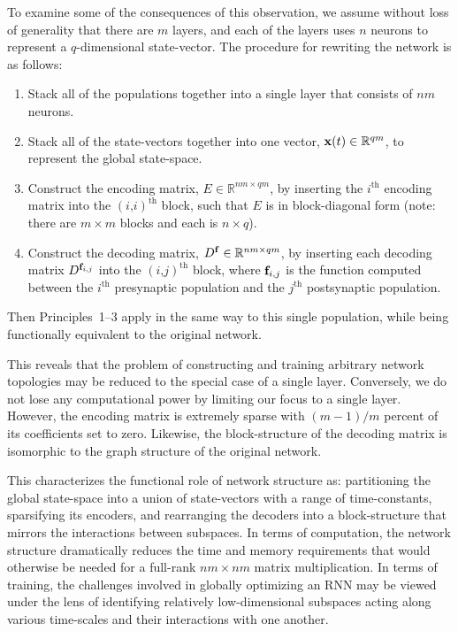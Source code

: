 To examine some of the consequences of this observation, we assume without loss of generality that there are $m$ layers, and each of the layers uses $n$ neurons to represent a $q$-dimensional state-vector.
The procedure for rewriting the network is as follows:
\begin{enumerate}
\item Stack all of the populations together into a single layer that consists of $nm$ neurons. 
\item Stack all of the state-vectors together into one vector, $\mathbf{x}(t) \in \mathbb{R}^{qm}$, to represent the global state-space.
\item Construct the encoding matrix, $E \in \mathbb{R}^{nm \times qm}$, by inserting the $i^\text{th}$ encoding matrix into the $(i\text{,} i)^\text{th}$ block, such that $E$ is in block-diagonal form (note: there are $m \times m$ blocks and each is $n \times q$).
\item Construct the decoding matrix, $D^{\mathbf{f}} \in \mathbb{R}^{nm \times qm}$, by inserting each decoding matrix $D^{\mathbf{f}_{i\text{,}j}}$ into the $(i\text{,} j)^\text{th}$ block, where $\mathbf{f}_{i\text{,}j}$ is the function computed between the $i^\text{th}$ presynaptic population and the $j^\text{th}$ postsynaptic population.
\end{enumerate}
Then Principles~1--3 apply in the same way to this single population, while being functionally equivalent to the original network.

This reveals that the problem of constructing and training arbitrary network topologies may be reduced to the special case of a single layer.
Conversely, we do not lose any computational power by limiting our focus to a single layer.
However, the encoding matrix is extremely sparse with $(m - 1) / m$ percent of its coefficients set to zero.
Likewise, the block-structure of the decoding matrix is isomorphic to the graph structure of the original network.

This characterizes the functional role of network structure as: partitioning the global state-space into a union of state-vectors with a range of time-constants, sparsifying its encoders, and rearranging the decoders into a block-structure that mirrors the interactions between subspaces.
In terms of computation, the network structure dramatically reduces the time and memory requirements that would otherwise be needed for a full-rank $nm \times nm$ matrix multiplication.
In terms of training, the challenges involved in globally optimizing an RNN may be viewed under the lens of identifying relatively low-dimensional subspaces acting along various time-scales and their interactions with one another.


